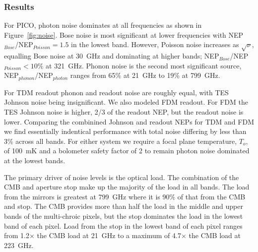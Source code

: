 \documentclass[]{spie}  %
\begin{document}
\subsubsection{Results}  %

For PICO, photon noise dominates at all frequencies as shown in Figure~\ref{fig:noise}. Bose noise is most significant 
at lower frequencies with NEP$_{Bose}$/NEP$_{Poisson}= 1.5 $ in the lowest band.  However, Poisson noise increases as 
$\sqrt{\nu}$, equalling Bose noise at 30~GHz and dominating at higher bands; NEP$_{Bose}$/NEP$_{Poisson} <10\%$ at 321~GHz. 
Phonon noise is the second most significant source, NEP$_{phonon}$/NEP$_{photon}$ ranges from 65\% at 21~GHz 
to 19\% at 799~GHz. 

For TDM readout phonon and readout noise are roughly equal, with TES Johnson noise being insignificant.  We also modeled 
FDM readout.  For FDM the TES Johnson noise is higher, 2/3 of the readout NEP, but the readout 
noise is lower.  Comparing the combinined Johnson and readout NEPs for TDM and FDM we find essentially indentical performance 
with total noise differing by less than 3\% across all bands.  For either system we require a focal plane temperature, $T_o$, of 
100~mK and a bolometer safety factor of 2 to remain photon noise dominated at the lowest bands.

The primary driver of noise levels is the optical load.  The combination of the CMB and aperture stop make up the majority of the load in all bands.
The load from the mirrors is greatest at 799~GHz where it is 90\% of that from the CMB and stop. The CMB provides more than half the load 
in the middle and upper bands of the multi-chroic pixels, but the stop dominates the load in the lowest band of each pixel.  Load from the 
stop in the lowest band of each pixel ranges from 1.2$\times$ the CMB load at 21~GHz to a maximum of 4.7$\times$ the CMB load at 223~GHz. 


\end{document}

